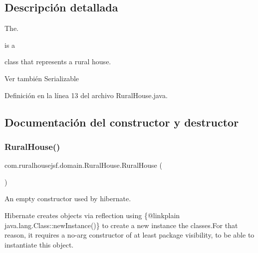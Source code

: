 \subsection{Descripción detallada}
The. 


\begin{DoxyCode}{0}
\end{DoxyCode}
 is a
\begin{DoxyCode}{0}
\end{DoxyCode}
 class that represents a rural house.

\begin{DoxySeeAlso}{Ver también}
Serializable 
\end{DoxySeeAlso}


Definición en la línea 13 del archivo Rural\+House.\+java.



\subsection{Documentación del constructor y destructor}
\mbox{\label{classcom_1_1ruralhousejsf_1_1domain_1_1_rural_house_a6312a6b35355d7883853544db74662f8}} 
\subsubsection{\texorpdfstring{RuralHouse()}{RuralHouse()}\hspace{0.1cm}{\footnotesize\ttfamily [1/3]}}
{\footnotesize\ttfamily com.\+ruralhousejsf.\+domain.\+Rural\+House.\+Rural\+House (\begin{DoxyParamCaption}{ }\end{DoxyParamCaption})\hspace{0.3cm}{\ttfamily [package]}}



An empty constructor used by hibernate. 

Hibernate creates objects via reflection using \{@linkplain java.\+lang.\+Class\+::new\+Instance()\} to create a new instance the classes.\+For that reason, it requires a no-\/arg constructor of at least package visibility, to be able to instantiate this object. 

